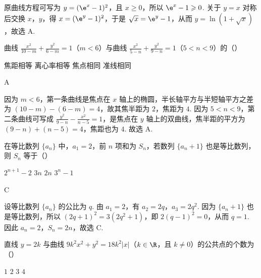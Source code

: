 \begin{solution}
原曲线方程可写为 \(y=(\e^x-1)^2\)，且 \(x\geqslant0\)，所以 \(\e^x-1\geqslant0\). 关于 \(y=x\) 对称后交换 \(x\)，\(y\)，得 \(x=(\e^y-1)^2\)，于是 \(\sqrt{x}=\e^y-1\)，从而 \(y=\ln(1+\sqrt{x})\)，故选 A.
\end{solution}

\begin{problem}
曲线 \(\frac{x^2}{10 - m} + \frac{y^2}{6 - m} = 1 \)（\(m < 6\)）与曲线 \(\frac{x^2}{5 - n} + \frac{y^2}{9 - n} = 1 \)（\(5 < n < 9\)）的（\quad）

\choices
    {焦距相等}
    {离心率相等}
    {焦点相同}
    {准线相同}
\end{problem}

\begin{answer}
A
\end{answer}

\begin{solution}
因为 \(m<6\)，第一条曲线是焦点在 \(x\) 轴上的椭圆，半长轴平方与半短轴平方之差为 \((10-m)-(6-m)=4\)，故其焦半距为 \(2\)，焦距为 \(4\). 因为 \(5<n<9\)，第二条曲线可写成 \(\frac{y^2}{9-n}-\frac{x^2}{n-5}=1\)，是焦点在 \(y\) 轴上的双曲线，焦半距的平方为 \((9-n)+(n-5)=4\)，焦距也为 \(4\). 故选 A.
\end{solution}

\begin{problem}
在等比数列 \(\{a_{n}\}\) 中，\(a_{1} = 2\)，前 \(n\) 项和为 \(S_{n}\)，若数列 \(\{a_{n} + 1\}\) 也是等比数列，则 \(S_{n}\) 等于（\quad）

\choices
    {\(2^{n + 1} - 2\)}
    {\(3n\)}
    {\(2n\)}
    {\(3^n -1\)}
\end{problem}

\begin{answer}
C
\end{answer}

\begin{solution}
设等比数列 \(\{a_n\}\) 的公比为 \(q\). 由 \(a_1=2\)，有 \(a_2=2q\)，\(a_3=2q^2\). 因为 \(\{a_n+1\}\) 也是等比数列，所以 \((2q+1)^2=3(2q^2+1)\)，即 \(2(q-1)^2=0\)，从而 \(q=1\). 因此 \(a_n=2\)，\(S_n=2n\)，故选 C.
\end{solution}

\begin{problem}
直线 \( y = 2k \) 与曲线 \( 9k^2 x^2 + y^2 = 18k^2 |x| \)（\(k \in \R\)，且 \(k \neq 0\)）的公共点的个数为（\quad）

\choices
    {\(1\)}
    {\(2\)}
    {\(3\)}
    {\(4\)}
\end{problem}

